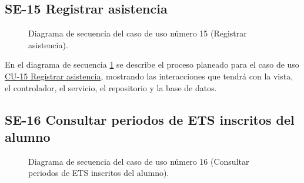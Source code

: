 \newpage

\subsection{SE-15 Registrar asistencia}

\begin{figure}[htbp!]
	\begin{center}
		\caption{Diagrama de secuencia del caso de uso número 15 (Registrar asistencia).}
		\label{fig:Diagrama de secuencia CU-15}
	\end{center}
\end{figure}

En el diagrama de secuencia \ref{fig:Diagrama de secuencia CU-15} se describe el proceso planeado para el caso de uso \hyperlink{CU-15}{CU-15 Registrar asistencia}, mostrando las interacciones que tendrá con la vista, el controlador, el servicio, el repositorio y la base de datos.

\subsection{SE-16 Consultar periodos de ETS inscritos del alumno}

\begin{figure}[htbp!]
	\begin{center}
		\caption{Diagrama de secuencia del caso de uso número 16 (Consultar periodos de ETS inscritos del alumno).}
		\label{fig:Diagrama de secuencia CU-16}
	\end{center}
\end{figure}

